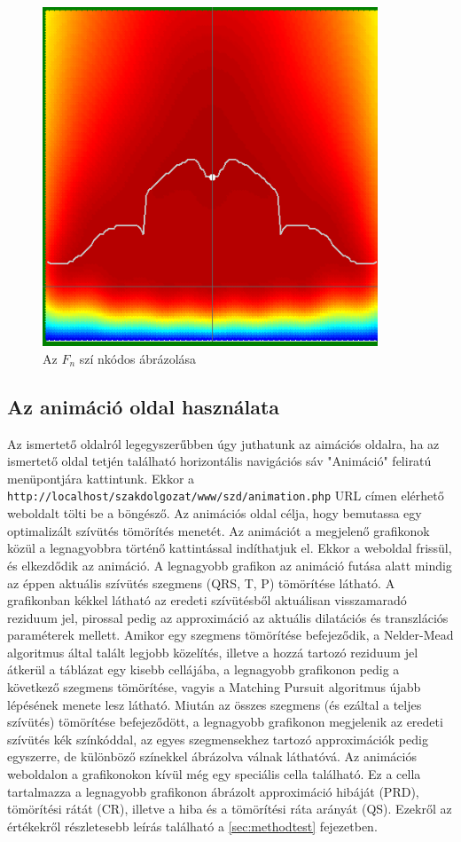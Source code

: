 \documentclass[oneside,titlepage,12pt,a4paper]{report}
\begin{document}
\begin{figure}[H]
\begin{center}
   \includegraphics[width=100mm]{./Abrak/Ereszkedo1/F_2sz.png}
  \caption{Az $F_n$ szí nkódos ábrázolása}
\end{center}
\end{figure}

\subsection*{Az animáció oldal használata}

Az ismertető oldalról legegyszerűbben úgy juthatunk az aimációs oldalra, ha az ismertető oldal tetjén található horizontális navigációs sáv "Animáció" feliratú menüpontjára kattintunk. Ekkor a \texttt{http://localhost/szakdolgozat/www/szd/animation.php} URL címen elérhető weboldalt tölti be a böngésző. Az animációs oldal célja, hogy bemutassa egy optimalizált szívütés tömörítés menetét. Az animációt a megjelenő grafikonok közül a legnagyobbra történő kattintással indíthatjuk el. Ekkor a weboldal frissül, és elkezdődik az animáció. A legnagyobb grafikon az animáció futása alatt mindig az éppen aktuális szívütés szegmens (QRS, T, P) tömörítése látható. A grafikonban kékkel látható az eredeti szívütésből aktuálisan visszamaradó reziduum jel, pirossal pedig az approximáció az aktuális dilatációs és transzlációs paraméterek mellett. Amikor egy szegmens tömörítése befejeződik, a Nelder-Mead algoritmus által talált legjobb közelítés, illetve a hozzá tartozó reziduum jel átkerül a táblázat egy kisebb cellájába, a legnagyobb grafikonon pedig a következő szegmens tömörítése, vagyis a Matching Pursuit algoritmus újabb lépésének menete lesz látható. Miután az összes szegmens (és ezáltal a teljes szívütés) tömörítése befejeződött, a legnagyobb grafikonon megjelenik az eredeti szívütés kék színkóddal, az egyes szegmensekhez tartozó approximációk pedig egyszerre, de különböző színekkel ábrázolva válnak láthatóvá. Az animációs weboldalon a grafikonokon kívül még egy speciális cella található. Ez a cella tartalmazza a legnagyobb grafikonon ábrázolt approximáció hibáját (PRD), tömörítési rátát (CR), illetve a hiba és a tömörítési ráta arányát (QS). Ezekről az értékekről részletesebb leírás található a \ref{sec:methodtest} fejezetben.
\end{document}
